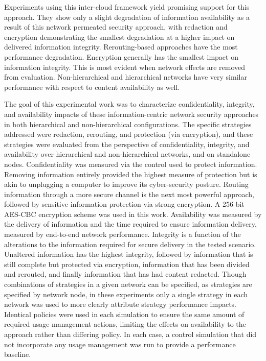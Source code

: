 Experiments using this inter-cloud framework yield promising support for this approach.  They show only a slight degradation of information availability as a result of this network permeated security approach, with redaction and encryption demonstrating the smallest degradation at a higher impact on delivered information integrity.  Rerouting-based approaches have the most performance degradation. Encryption generally has the smallest impact on information integrity.  This is most evident when network effects are removed from evaluation.  Non-hierarchical and hierarchical networks have very similar performance with respect to content availability as well.

The goal of this experimental work was to characterize confidentiality, integrity, and availability impacts of these information-centric network security approaches in both hierarchical and non-hierarchical configurations.  The specific strategies addressed were redaction, rerouting, and protection (via encryption), and these strategies were evaluated from the perspective of confidentiality, integrity, and availability over hierarchical and non-hierarchical networks, and on standalone nodes. Confidentiality was measured via the control used to protect information.  Removing information entirely provided the highest measure of protection but is akin to unplugging a computer to improve its cyber-security posture.   Routing information through a more secure channel is the next most powerful approach, followed by sensitive information protection via strong encryption.  A 256-bit AES-CBC encryption scheme was used in this work.  Availability was measured by the delivery of information and the time required to ensure information delivery, measured by end-to-end network performance.  Integrity is a function of the alterations to the information required for secure delivery in the tested scenario.  Unaltered information has the highest integrity, followed by information that is still complete but protected via encryption, information that has been divided and rerouted, and finally information that has had content redacted.  Though combinations of strategies in a given network can be specified, as strategies are specified by network node, in these experiments only a single strategy in each network was used to more clearly attribute strategy performance impacts. Identical policies were used in each simulation to ensure the same amount of required usage management actions, limiting the effects on availability to the approach rather than differing policy.  In each case, a control simulation that did not incorporate any usage management was run to provide a performance baseline.  

